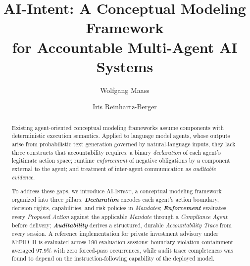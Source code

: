 \documentclass[runningheads]{llncs}
\begin{document}
\title{AI-Intent: A Conceptual Modeling Framework\\
for Accountable Multi-Agent AI Systems}


\author{Wolfgang Maass \and Iris Reinhartz-Berger}

\maketitle

\begin{abstract}
Existing agent-oriented conceptual modeling frameworks assume components with deterministic execution semantics. Applied to language model agents, whose outputs arise from probabilistic text generation governed by natural-language inputs, they lack three constructs that accountability requires: a binary \emph{declaration} of each agent's legitimate action space; runtime \emph{enforcement} of negative obligations by a component external to the agent; and treatment of inter-agent communication as \emph{auditable evidence}.

To address these gaps, we introduce \textsc{AI-Intent},
a conceptual modeling framework organized into three pillars:
\textbf{\textit{Declaration}} encodes each agent's action boundary, decision rights, capabilities, and risk policies in \textit{Mandates}; \textbf{\textit{Enforcement}} evaluates every \textit{Proposed Action} against the applicable \textit{Mandate} through a \textit{Compliance Agent} before delivery; \textbf{\textit{Auditability}} derives a structured, durable \textit{Accountability Trace} from every session.
A reference implementation for private investment advisory under MiFID~II is evaluated across 190 evaluation sessions: boundary violation containment averaged 97.9\% with zero forced-pass occurrences, while audit trace completeness was found to depend on the instruction-following capability of the deployed model.

\end{abstract}
\end{document}
